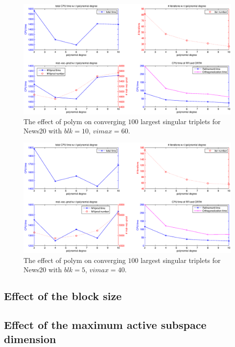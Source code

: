 \documentclass[11pt]{article}
\numberwithin{equation}{section}
\numberwithin{figure}{section}
\numberwithin{table}{section}
\begin{document}
\begin{figure}
\centering
\includegraphics[scale=0.5]{nytimes_polym_blk10_v60.eps}
\caption{The effect of polym on converging $100$ largest singular triplets for News20 with $blk = 10$, $vimax = 60$.}
\label{nytimes_polym2}
\end{figure}

\begin{figure}
\centering
\includegraphics[scale=0.5]{nytimes_polym_blk5_v40.eps}
\caption{The effect of polym on converging $100$ largest singular triplets for News20 with $blk = 5$, $vimax = 40$.}
\label{nytimes_polym3}
\end{figure}
\subsection{Effect of the block size}


\subsection{Effect of the maximum active subspace dimension}


\end{document}
